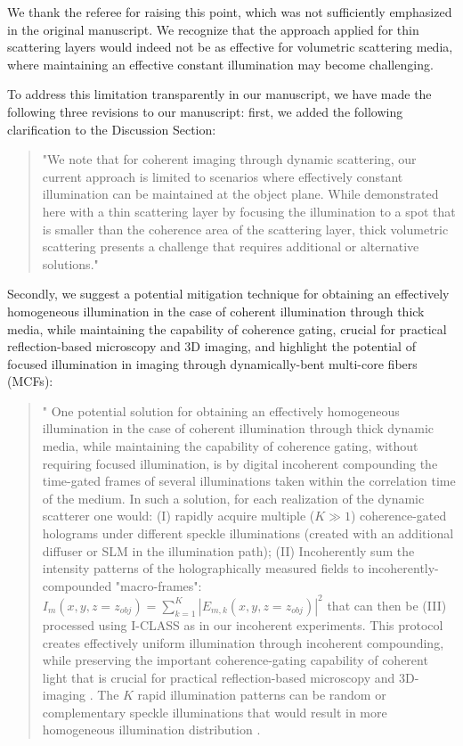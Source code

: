 \documentclass[12pt]{article}
\newenvironment{ourresponse}
    {\begin{tcolorbox}[width=\linewidth,breakable,enhanced,colback=gray!5,colframe=responsecolor!50,title=Response,left=5pt,right=5pt]}
    {\end{tcolorbox}}
\begin{document}
\begin{ourresponse}
    We thank the referee for raising this point, which was not sufficiently emphasized in the original manuscript. 
We recognize that the approach applied for thin scattering layers would indeed not be as effective for volumetric scattering media, where maintaining an effective constant illumination may become challenging.
    
    To address this limitation transparently in our manuscript, we have made the following three revisions to our manuscript: first, we added the following clarification to the Discussion Section:
    
    \begin{quote}
        "We note that for coherent imaging through dynamic scattering, our current approach is limited to scenarios where effectively constant illumination can be maintained at the object plane. While demonstrated here with a thin scattering layer by focusing the illumination to a spot that is smaller than the coherence area of the scattering layer, thick volumetric scattering presents a challenge that requires additional or alternative solutions."
    \end{quote}
     Secondly, we suggest a potential mitigation technique for obtaining an effectively homogeneous illumination in the case of coherent illumination through thick media, while maintaining the capability of coherence gating, crucial for practical reflection-based microscopy and 3D imaging, and highlight the potential of focused illumination in imaging through dynamically-bent multi-core fibers (MCFs):

     \begin{quote}
     "
    One potential solution for obtaining an effectively homogeneous illumination in the case of coherent illumination through thick dynamic media, while maintaining the capability of coherence gating, without requiring focused illumination, is by digital incoherent compounding the time-gated frames of several illuminations taken within the correlation time of the medium. 
    In such a solution, for each realization of the dynamic scatterer one would: (I) rapidly acquire multiple ($K \gg 1$) coherence-gated holograms under different speckle illuminations (created with an additional diffuser or SLM in the illumination path); (II) Incoherently sum the intensity patterns of the holographically measured fields to incoherently-compounded "macro-frames": $I_m(x,y,z=z_{obj}) = \sum_{k=1}^{K}|E_{m,k}(x,y,z=z_{obj})|^2$  that can then be (III) processed using I-CLASS as in our incoherent experiments.
    This protocol creates effectively uniform illumination through incoherent compounding, while preserving the important coherence-gating capability of coherent light that is crucial for practical reflection-based microscopy and 3D-imaging . The $K$ rapid illumination patterns can be random or complementary speckle illuminations that would result in more homogeneous illumination distribution \cite{gateau2017complementary}.


\end{quote}
\end{ourresponse}
\end{document}
